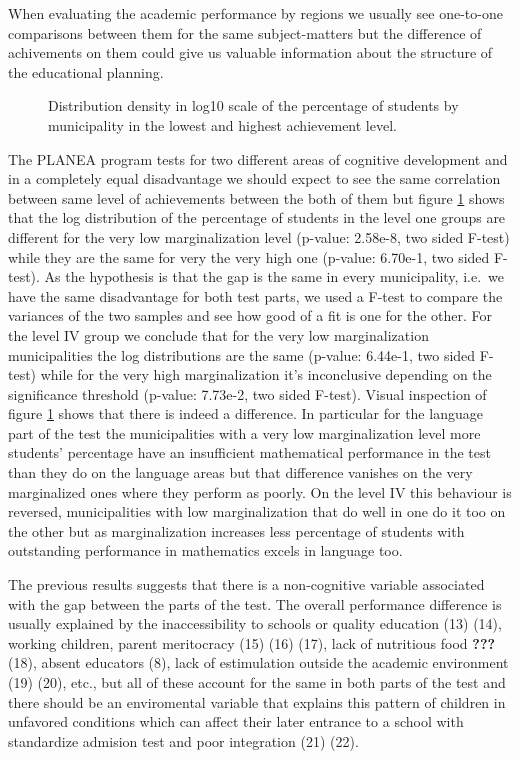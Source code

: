 \documentclass[9pt,twocolumn,twoside,]{pnas-new}
\begin{document}
When evaluating the academic performance by regions we usually see
one-to-one comparisons between them for the same subject-matters but the
difference of achivements on them could give us valuable information
about the structure of the educational planning.

\begin{figure}[H]
\quad
{}
\caption{Distribution density in log10 scale of the percentage of students by municipality in the lowest and highest achievement level.}
\label{fig:ridgeMarg}
\end{figure}

The PLANEA program tests for two different areas of cognitive
development and in a completely equal disadvantage we should expect to
see the same correlation between same level of achievements between the
both of them but figure \ref{fig:ridgeMarg} shows that the log
distribution of the percentage of students in the level one groups are
different for the very low marginalization level (p-value: 2.58e-8, two
sided F-test) while they are the same for very the very high one
(p-value: 6.70e-1, two sided F-test). As the hypothesis is that the gap
is the same in every municipality, i.e.~we have the same disadvantage
for both test parts, we used a F-test to compare the variances of the
two samples and see how good of a fit is one for the other. For the
level IV group we conclude that for the very low marginalization
municipalities the log distributions are the same (p-value: 6.44e-1, two
sided F-test) while for the very high marginalization it's inconclusive
depending on the significance threshold (p-value: 7.73e-2, two sided
F-test). Visual inspection of figure \ref{fig:ridgeMarg} shows that
there is indeed a difference. In particular for the language part of the
test the municipalities with a very low marginalization level more
students' percentage have an insufficient mathematical performance in
the test than they do on the language areas but that difference vanishes
on the very marginalized ones where they perform as poorly. On the level
IV this behaviour is reversed, municipalities with low marginalization
that do well in one do it too on the other but as marginalization
increases less percentage of students with outstanding performance in
mathematics excels in language too.

The previous results suggests that there is a non-cognitive variable
associated with the gap between the parts of the test. The overall
performance difference is usually explained by the inaccessibility to
schools or quality education (13) (14), working children, parent
meritocracy (15) (16) (17), lack of nutritious food \textbf{???} (18),
absent educators (8), lack of estimulation outside the academic
environment (19) (20), etc., but all of these account for the same in
both parts of the test and there should be an enviromental variable that
explains this pattern of children in unfavored conditions which can
affect their later entrance to a school with standardize admision test
and poor integration (21) (22).
\end{document}
